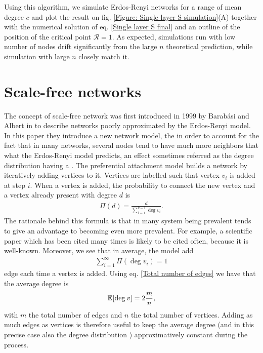 \documentclass[
11pt, %
english, %
singlespacing, %
nolistspacing, %
liststotoc, %
headsepline, %
]{MastersDoctoralThesis} %
\begin{document}
Using this algorithm, we simulate Erdos-Renyi networks for a range of mean degree $c$ and plot the result on fig. \ref{Figure: Single layer S simulation}(A) together with the numerical solution of eq. \eqref{Single layer S final} and an outline of the position of the critical point $\mathcal{R} = 1$. As expected, simulations run with low number of nodes drift significantly from the large $n$ theoretical prediction, while simulation with large $n$ closely match it.

\section{Scale-free networks}

The concept of scale-free network was first introduced in 1999 by Barabási and Albert in \cite{barabasi1999emergence} to describe networks poorly approximated by the Erdos-Renyi model. In this paper they introduce a new network model, the  in order to account for the fact that in many networks, several nodes tend to have much more neighbors that what the Erdos-Renyi model predicts, an effect sometimes referred as the degree distribution having a . The preferential attachment model builds a network by iteratively adding vertices to it. Vertices are labelled such that vertex $v_i$ is added at step $i$. When a vertex is added, the probability to connect the new vertex and a vertex already present with degree $d$ is
\begin{align}
	\Pi(d) = \frac{d}{\sum_{i=1}^{k - 1} \deg{v_i}}. \label{Preferential attachment probability}
\end{align}
The rationale behind this formula is that in many system being prevalent tends to give an advantage to becoming even more prevalent. For example, a scientific paper which has been cited many times is likely to be cited often, because it is well-known. Moreover, we see that in average, the model add
\begin{align}
	\sum_{i=1}^\infty \Pi(\deg{v_i}) = 1
\end{align}
edge each time a vertex is added. Using eq. \eqref{Total number of edges} we have that the average degree is
\begin{align}
	\mathbb{E}_{}\!\left[ \mathrm{deg}_{}\, v \right] = 2 \frac{m}{n},
\end{align}
with $m$ the total number of edges and $n$ the total number of vertices. Adding as much edges as vertices is therefore useful to keep the average degree (and in this precise case also the degree distribution \cite{barabasi1999emergence}) approximatively constant during the process.
\end{document}
